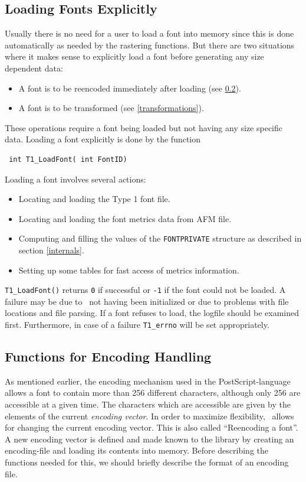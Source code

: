 \subsection{Loading Fonts Explicitly}
\label{loading}%
Usually there is no need for a user to load a font into memory since this is
done automatically as needed by the rastering functions. But there are two
situations where it makes sense to explicitly load a font before generating
any size dependent data:
\begin{itemize}
\item A font is to be reencoded immediately after loading (see \ref{encoding}).
\item A font is to be transformed (see \ref{transformations}).
\end{itemize}
These operations require a font being loaded but not having any size specific
data. Loading a font explicitly is done by the function
\precorr
\begin{verbatim}
 int T1_LoadFont( int FontID)
\end{verbatim}\postcorr
Loading a font involves several actions:
\begin{itemize}
\item Locating and loading the Type 1 font file.
\item Locating and loading the font metrics data from AFM file.
\item Computing and filling the values of the \verb+FONTPRIVATE+ structure as
  described in section \ref{internals}.
\item Setting up some tables for fast access of metrics information.
\end{itemize}
\verb+T1_LoadFont()+ returns \verb+0+ if successful or \verb+-1+ if the font
could not be loaded. A failure may be due to \tonelib\ not having been
initialized or due to problems with file locations and file parsing. If a font
refuses to load, the logfile should be examined first. Furthermore, in case of
a failure \verb+T1_errno+ will be set appropriately.


\subsection{Functions for Encoding Handling}
\label{encoding}%
As mentioned earlier, the encoding mechanism used in the
PostScript-language allows a font to contain more than 256 different
characters, although only 256 are accessible at a given time. The
characters which are accessible are given by the elements of the
current {\em encoding vector}. In order to maximize flexibility,
\tonelib\ allows for changing the current encoding vector. This is
also called ``Reencoding a font''. A new encoding vector is defined
and made known to the library by creating an encoding-file and loading
its contents into memory. 
Before describing the functions needed for this, we should
briefly describe the format of an encoding file. 

